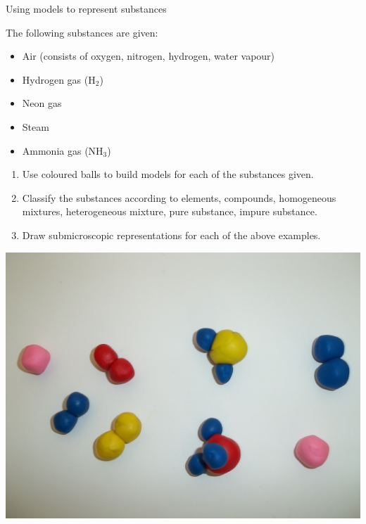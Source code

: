 \vspace{-1cm}
  \label{m38708*eip-326}
\begin{activity}{Using models to represent substances}{
\begin{minipage}{.5\textwidth}
The following substances are given:
\label{m38708*eip-id1166921187210}
\begin{itemize}[noitemsep]
    \item Air (consists of oxygen, nitrogen, hydrogen, water vapour)
    \item Hydrogen gas ($\mathrm{H}_2$)
    \item Neon gas
    \item Steam
    \item Ammonia gas ($\mathrm{NH}_3$)
\end{itemize}
\noindent
\begin{enumerate}[noitemsep, label=\textbf{\arabic*}.]
\item Use coloured balls to build models for each of the substances given.
\item Classify the substances according to elements, compounds, homogeneous mixtures, heterogeneous mixture, pure substance, impure substance.
\item Draw submicroscopic representations for each of the above examples.
\end{enumerate}
\end{minipage}
\begin{minipage}{.5\textwidth}
\begin{center}
 \includegraphics[width=.8\textwidth]{photos/models_classification.jpg}\par
\end{center}
\end{minipage}
}
\end{activity}
